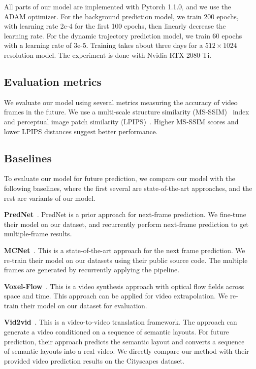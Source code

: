 \documentclass[10pt,twocolumn,letterpaper]{article}
\begin{document}
All parts of our model are implemented with Pytorch 1.1.0, and we use the ADAM optimizer. For the background prediction model, we train 200 epochs, with learning rate 2e-4 for the first 100 epochs, then linearly decrease the learning rate. For the dynamic trajectory prediction model, we train 60 epochs with a learning rate of 3e-5. Training takes about three days for a $512\times1024$ resolution model. The experiment is done with Nvidia RTX 2080 Ti. 
 
\subsection{Evaluation metrics}
We evaluate our model using several metrics measuring the accuracy of video frames in the future. We use a multi-scale structure similarity (MS-SSIM)~\cite{msssim} index and perceptual image patch similarity (LPIPS)~\cite{lpips}. Higher MS-SSIM scores and lower LPIPS distances suggest better performance.


\subsection{Baselines}
To evaluate our model for future prediction, we compare our model with the following baselines, where the first several are state-of-the-art approaches, and the rest are variants of our model. 


\vspace{2mm}
\noindent \textbf{PredNet}~\cite{prednet}. PredNet is a prior approach for next-frame prediction. We fine-tune their model on our dataset, and recurrently perform next-frame prediction to get multiple-frame results.

\vspace{2mm}
\noindent \textbf{MCNet}~\cite{villegas17mcnet}. This is a state-of-the-art approach for the next frame prediction. We re-train their model on our datasets using their public source code. The multiple frames are generated by recurrently applying the pipeline.

\vspace{2mm}
\noindent \textbf{Voxel-Flow}~\cite{liu2017voxelflow}. This is a video synthesis approach with optical flow fields across space and time. This approach can be applied for video extrapolation. We re-train their model on our dataset for evaluation.

\vspace{2mm}
\noindent \textbf{Vid2vid}~\cite{Wang2018}. This is a video-to-video translation framework. The approach can generate a video conditioned on a sequence of semantic layouts. For future prediction, their approach predicts the semantic layout and converts a sequence of semantic layouts into a real video. We directly compare our method with their provided video prediction results on the Cityscapes dataset.
\end{document}
